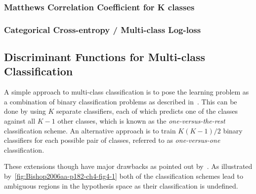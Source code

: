 \subsubsection{Matthews Correlation Coefficient for K classes}

\subsubsection{Categorical Cross-entropy / Multi-class Log-loss}




\subsection{Discriminant Functions for Multi-class Classification}

A simple approach to multi-class classification is to pose the learning problem as a combination of binary classification problems as described in~\cite[Chapter 4.1.2, p.~182]{Bishop:2006aa}. This can be done by using $K$ separate classifiers, each of which predicts one of the classes against all $K-1$ other classes, which is known as the \textit{one-versus-the-rest} classification scheme. An alternative approach is to train $K (K - 1) / 2$ binary classifiers for each possible pair of classes, referred to as \textit{one-versus-one} classification.

These extensions though have major drawbacks as pointed out by~\cite[Chapter 5.2.2]{Duda:1973aa}. As illustrated by~\ref{fig:Bishop2006aa-p182-ch4-fig4-1} both of the classification schemes lead to ambiguous regions in the hypothesis space as their classification is undefined.


